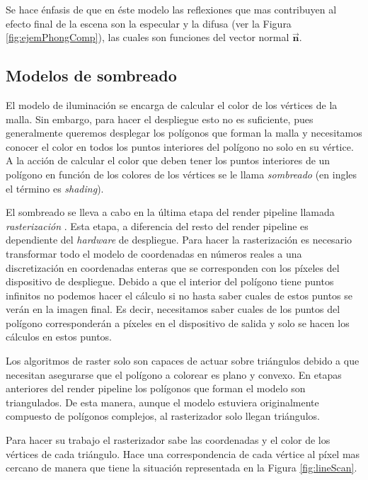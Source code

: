 Se hace énfasis de que en éste modelo las reflexiones que mas contribuyen al efecto final de la escena son la especular y la difusa (ver la Figura \ref{fig:ejemPhongComp}), las cuales son funciones del vector normal $\vec{\textbf{n}}$.

\subsection{Modelos de sombreado}

El modelo de iluminación se encarga de calcular el color de los vértices de la malla. Sin embargo, para hacer el despliegue esto no es suficiente, pues generalmente queremos desplegar los polígonos que forman la malla y necesitamos conocer el color en todos los puntos interiores del polígono no solo en su vértice. A la acción de calcular el color que deben tener los puntos interiores de un polígono en función de los colores de los vértices se le llama \emph{sombreado} (en ingles el término es \emph{shading}).

El sombreado se lleva a cabo en la última etapa del render pipeline llamada \emph{rasterización} \cite{redBook}. Esta etapa, a diferencia del resto del render pipeline es dependiente del \emph{hardware} de despliegue. Para hacer la rasterización es necesario transformar todo el modelo de coordenadas en números reales a una discretización en coordenadas enteras que se corresponden con los píxeles del dispositivo de despliegue\cite{shadersBook}. Debido a que el interior del polígono tiene puntos infinitos no podemos hacer el cálculo si no hasta saber cuales de estos puntos se verán en la imagen final. Es decir, necesitamos saber cuales de los puntos del polígono corresponderán a píxeles en el dispositivo de salida y solo se hacen los cálculos en estos puntos.

Los algoritmos de raster solo son capaces de actuar sobre triángulos debido a que necesitan asegurarse que el polígono a colorear es plano y convexo. En etapas anteriores del render pipeline los polígonos que forman el modelo son triangulados. De esta manera, aunque el modelo estuviera originalmente compuesto de polígonos complejos, al rasterizador solo llegan triángulos.

Para hacer su trabajo el rasterizador sabe las coordenadas y el color de los vértices de cada triángulo. Hace una correspondencia de cada vértice al píxel mas cercano de manera que tiene la situación representada en la Figura \ref{fig:lineScan}.

